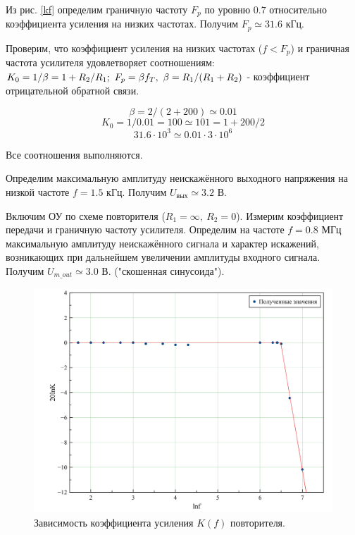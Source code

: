 \documentclass[a4paper, 12pt, twoside]{article}
\newcommand*{\hm}[1]{#1\nobreak\discretionary{}
	{\hbox{$\mathsurround=0pt #1$}}{}}
\begin{document}
Из рис. \ref{kf} определим граничную частоту $F_p$ по уровню $0.7$ относительно коэффициента усиления на низких частотах. Получим $F_p \simeq 31.6$ кГц.
\vspace{\baselineskip}

Проверим, что коэффициент усиления на низких частотах ($f < F_p$) и граничная частота усилителя удовлетворяет соотношениям: $K_0 = 1/\beta = 1+R_2/R_1;~ F_p = \beta f_T,~ \beta \hm{=} R_1/(R_1+R_2)$ - коэффициент отрицательной обратной связи.

$$\beta = 2/(2+200) \simeq 0.01 $$  
$$K_0 = 1/0.01 = 100 \simeq 101 = 1 + 200/2$$
$$31.6 \cdot 10^3 \simeq 0.01\cdot 3 \cdot 10^6$$

Все соотношения выполняются.
\vspace{\baselineskip}

Определим максимальную амплитуду неискажённого выходного напряжения на низкой частоте $f = 1.5$ кГц. Получим $U_{\text{вых}} \simeq 3.2$ В.
\vspace{\baselineskip}

Включим ОУ по схеме повторителя ($R_1 = \infty,~R_2 = 0$). Измерим коэффициент передачи и граничную частоту усилителя. Определим на частоте $f = 0.8$ МГц максимальную амплитуду неискажённого сигнала и характер искажений, возникающих при дальнейшем увеличении амплитуды входного сигнала. Получим $U_{m\_out} \simeq 3.0$ В. ("скошенная синусоида").
\begin{table}[H]
	\centering
	\caption{Зависимость коэффициента передачи повторителя.}
	\label{zk}
\end{table}

\begin{figure}[H]
	\centering
	\includegraphics[width =  0.7\linewidth]{31}
	\caption{Зависимость коэффициента усиления $K(f)$ повторителя.}
	\label{kfp}
\end{figure}
\end{document}
